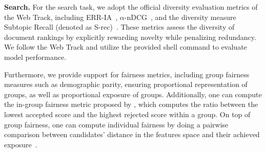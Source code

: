 \noindent\textbf{Search.} For the search task, we adopt the official diversity evaluation metrics of the Web Track, including ERR-IA~\cite{erria_09_cikm}, $\alpha$-nDCG~\cite{andcg_08_sigir}, and the diversity measure Subtopic Recall (denoted as S-rec)~\cite{srec15sigir}. These metrics assess the diversity of document rankings by explicitly rewarding novelty while penalizing redundancy. We follow the Web Track and utilize the provided shell command to evaluate model performance.

Furthermore, we provide support for fairness metrics, including group fairness measures such as demographic parity, ensuring proportional representation of groups, as well as proportional exposure of groups. Additionally, one can compute the in-group fairness metric proposed by \citet{yang2019balanced}, which computes the ratio between the lowest accepted score and the highest rejected score within a group. On top of group fairness, one can compute individual fairness by doing a pairwise comparison between candidates' distance in the features space and their achieved exposure~\cite{dwork2012fairness}. %



